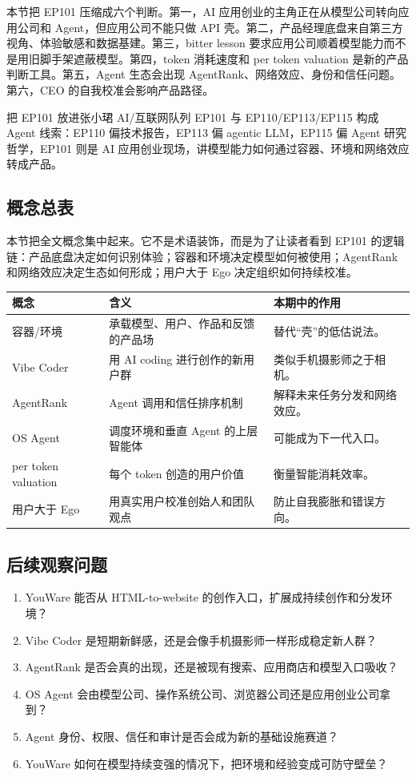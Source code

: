 \documentclass[a4paper]{article}
\begin{document}
本节把 EP101 压缩成六个判断。第一，AI 应用创业的主角正在从模型公司转向应用公司和 Agent，但应用公司不能只做 API 壳。第二，产品经理底盘来自第三方视角、体验敏感和数据基建。第三，bitter lesson 要求应用公司顺着模型能力而不是用旧脚手架遮蔽模型。第四，token 消耗速度和 per token valuation 是新的产品判断工具。第五，Agent 生态会出现 AgentRank、网络效应、身份和信任问题。第六，CEO 的自我校准会影响产品路径。

\begin{importantbox}{把 EP101 放进张小珺 AI/互联网队列}
EP101 与 EP110/EP113/EP115 构成 Agent 线索：EP110 偏技术报告，EP113 偏 agentic LLM，EP115 偏 Agent 研究哲学，EP101 则是 AI 应用创业现场，讲模型能力如何通过容器、环境和网络效应转成产品。
\end{importantbox}

\subsection{概念总表}

本节把全文概念集中起来。它不是术语装饰，而是为了让读者看到 EP101 的逻辑链：产品底盘决定如何识别体验；容器和环境决定模型如何被使用；AgentRank 和网络效应决定生态如何形成；用户大于 Ego 决定组织如何持续校准。

\noindent\begin{tabularx}{\textwidth}{p{}p{}X}
\toprule
概念 & 含义 & 本期中的作用 \\
\midrule
容器/环境 & 承载模型、用户、作品和反馈的产品场 & 替代“壳”的低估说法。 \\
Vibe Coder & 用 AI coding 进行创作的新用户群 & 类似手机摄影师之于相机。 \\
AgentRank & Agent 调用和信任排序机制 & 解释未来任务分发和网络效应。 \\
OS Agent & 调度环境和垂直 Agent 的上层智能体 & 可能成为下一代入口。 \\
per token valuation & 每个 token 创造的用户价值 & 衡量智能消耗效率。 \\
用户大于 Ego & 用真实用户校准创始人和团队观点 & 防止自我膨胀和错误方向。 \\
\bottomrule
\end{tabularx}

\subsection{后续观察问题}

\begin{enumerate}
\item YouWare 能否从 HTML-to-website 的创作入口，扩展成持续创作和分发环境？
\item Vibe Coder 是短期新鲜感，还是会像手机摄影师一样形成稳定新人群？
\item AgentRank 是否会真的出现，还是被现有搜索、应用商店和模型入口吸收？
\item OS Agent 会由模型公司、操作系统公司、浏览器公司还是应用创业公司拿到？
\item Agent 身份、权限、信任和审计是否会成为新的基础设施赛道？
\item YouWare 如何在模型持续变强的情况下，把环境和经验变成可防守壁垒？
\end{enumerate}
\end{document}
